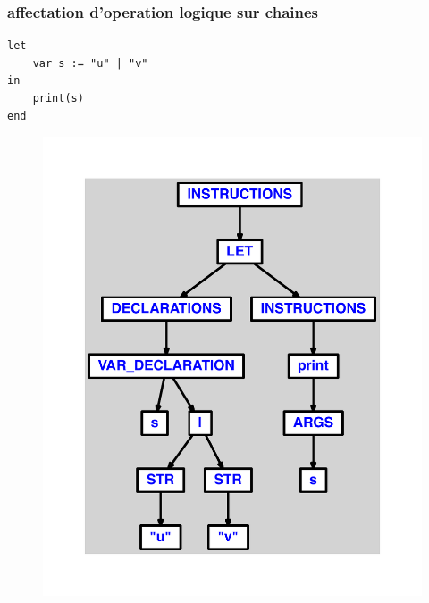 \documentclass{article}
\begin{document}
\subsubsection{affectation d'operation logique sur chaines}
\begin{lstlisting}
let
	var s := "u" | "v"
in
	print(s)
end
\end{lstlisting}
\newpage
\begin{figure}[H]
\centering
\includegraphics[max width=\textwidth]{ast/ast_300.pdf}
\end{figure}
\newpage
\end{document}
